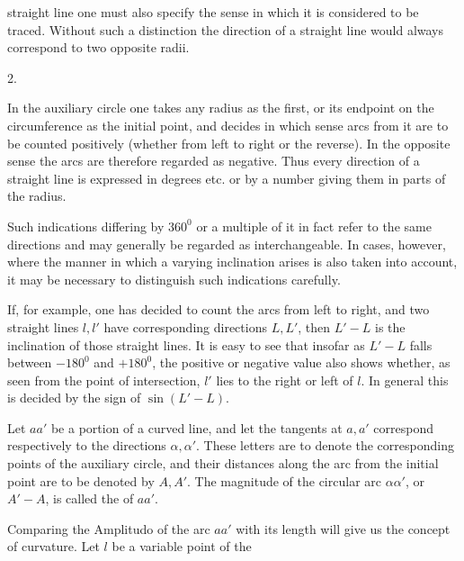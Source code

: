 %
straight line one must also specify the sense in which it is considered to be traced. Without such a distinction the direction of a straight line would always correspond to two opposite radii.

\begin{center}2.\end{center}
\noindent\hspace*{1.2em}In the auxiliary circle one takes any radius as the first, or its endpoint on the circumference as the initial point, and decides in which sense arcs from it are to be counted positively (whether from left to right or the reverse). In the opposite sense the arcs are therefore regarded as negative. Thus every direction of a straight line is expressed in degrees etc. or by a number giving them in parts of the radius.

Such indications differing by $360^{0}$ or a multiple of it in fact refer to the same directions and may generally be regarded as interchangeable. In cases, however, where the manner in which a varying inclination arises is also taken into account, it may be necessary to distinguish such indications carefully.

If, for example, one has decided to count the arcs from left to right, and two straight lines $l,l'$ have corresponding directions $L,L'$, then $L'-L$ is the inclination of those straight lines. It is easy to see that insofar as $L'-L$ falls between $-180^{0}$ and $+180^{0}$, the positive or negative value also shows whether, as seen from the point of intersection, $l'$ lies to the right or left of $l$. In general this is decided by the sign of $\sin(L'-L)$.

Let $aa'$ be a portion of a curved line, and let the tangents at $a,a'$ correspond respectively to the directions $\alpha,\alpha'$. These letters are to denote the corresponding points of the auxiliary circle, and their distances along the arc from the initial point are to be denoted by $A,A'$. The magnitude of the circular arc $\alpha\alpha'$, or $A'-A$, is called the  of $aa'$.

Comparing the Amplitudo of the arc $aa'$ with its length will give us the concept of curvature. Let $l$ be a variable point of the\space%
